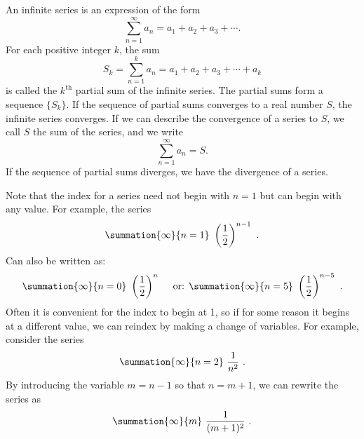 \documentclass{report}
\begin{document}
    \begin{definition}
       An infinite series is an expression of the form
\[
\sum_{n=1}^{\infty} a_n = a_1 + a_2 + a_3 + \cdots.
\]
For each positive integer $k$, the sum
\[
S_k = \sum_{n=1}^{k} a_n = a_1 + a_2 + a_3 + \cdots + a_k
\]
is called the $k^{\text{th}}$ partial sum of the infinite series. The partial sums form a sequence $\{S_k\}$. If the sequence of partial sums converges to a real number $S$, the infinite series converges. If we can describe the convergence of a series to $S$, we call $S$ the sum of the series, and we write
\[
\sum_{n=1}^{\infty} a_n = S.
\]
If the sequence of partial sums diverges, we have the divergence of a series.
    \end{definition}
    \bigbreak \noindent 
    Note that the index for a series need not begin with $n=1$ but can begin with any value. For example, the series
    \begin{align*}
        \summation{\infty}{n=1}\ \left(\frac{1}{2}\right)^{n-1}\ 
    .\end{align*}
    Can also be written as:
    \begin{align*}
        \summation{\infty}{n=0}\ \left(\frac{1}{2}\right)^{n}\ \quad \text{or: } \summation{\infty}{n=5}\ \left(\frac{1}{2}\right)^{n-5}\  
    .\end{align*}
    \bigbreak \noindent 
    Often it is convenient for the index to begin at  1,
  so if for some reason it begins at a different value, we can reindex by making a change of variables. For example, consider the series
  \begin{align*}
      \summation{\infty}{n=2}\ \frac{1}{n^{2}}\ 
  .\end{align*}
  By introducing the variable  $m=n-1$ so that  $n=m+1$,
  we can rewrite the series as
  \begin{align*}
      \summation{\infty}{m}\ \frac{1}{(m+1)^{2}}\ 
  .\end{align*}
\end{document}
